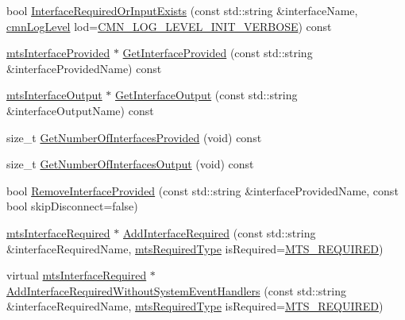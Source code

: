 \begin{DoxyCompactItemize}
\item 
bool \hyperlink{classmts_component_a02d443909ac1735fde4adaad6cec21e0}{Interface\+Required\+Or\+Input\+Exists} (const std\+::string \&interface\+Name, \hyperlink{cmn_log_lo_d_8h_a70c67165c37a0971e0dd1a85d4edaaae}{cmn\+Log\+Level} lod=\hyperlink{cmn_log_lo_d_8h_ae0fcf22a2f3faaba0c5bf49a237e3f3e}{C\+M\+N\+\_\+\+L\+O\+G\+\_\+\+L\+E\+V\+E\+L\+\_\+\+I\+N\+I\+T\+\_\+\+V\+E\+R\+B\+O\+S\+E}) const 
\item 
\hyperlink{classmts_interface_provided}{mts\+Interface\+Provided} $\ast$ \hyperlink{classmts_component_aa3c86939242f85aba59e575993b3da36}{Get\+Interface\+Provided} (const std\+::string \&interface\+Provided\+Name) const 
\item 
\hyperlink{classmts_interface_output}{mts\+Interface\+Output} $\ast$ \hyperlink{classmts_component_ac34838dee3cbb399f6ded4059e21379c}{Get\+Interface\+Output} (const std\+::string \&interface\+Output\+Name) const 
\item 
size\+\_\+t \hyperlink{classmts_component_a63d048b67ce121c3877c3cd9500bb942}{Get\+Number\+Of\+Interfaces\+Provided} (void) const 
\item 
size\+\_\+t \hyperlink{classmts_component_a8303167749c3c69741df473fe18e6e65}{Get\+Number\+Of\+Interfaces\+Output} (void) const 
\item 
bool \hyperlink{classmts_component_a27330dca8456e4bcdbd33fa0189f5202}{Remove\+Interface\+Provided} (const std\+::string \&interface\+Provided\+Name, const bool skip\+Disconnect=false)
\item 
\hyperlink{classmts_interface_required}{mts\+Interface\+Required} $\ast$ \hyperlink{classmts_component_a9521c839440799846e90fb9756295ae5}{Add\+Interface\+Required} (const std\+::string \&interface\+Required\+Name, \hyperlink{mts_forward_declarations_8h_a9ef1ce54724afde7802db326ff8606f3}{mts\+Required\+Type} is\+Required=\hyperlink{mts_forward_declarations_8h_a9ef1ce54724afde7802db326ff8606f3ae01fd85391b60e546bbb1be9716c4ec9}{M\+T\+S\+\_\+\+R\+E\+Q\+U\+I\+R\+E\+D})
\item 
virtual \hyperlink{classmts_interface_required}{mts\+Interface\+Required} $\ast$ \hyperlink{classmts_component_a007fa609ad6324d5cce07f125fd4fb5a}{Add\+Interface\+Required\+Without\+System\+Event\+Handlers} (const std\+::string \&interface\+Required\+Name, \hyperlink{mts_forward_declarations_8h_a9ef1ce54724afde7802db326ff8606f3}{mts\+Required\+Type} is\+Required=\hyperlink{mts_forward_declarations_8h_a9ef1ce54724afde7802db326ff8606f3ae01fd85391b60e546bbb1be9716c4ec9}{M\+T\+S\+\_\+\+R\+E\+Q\+U\+I\+R\+E\+D})

\end{DoxyCompactItemize}
